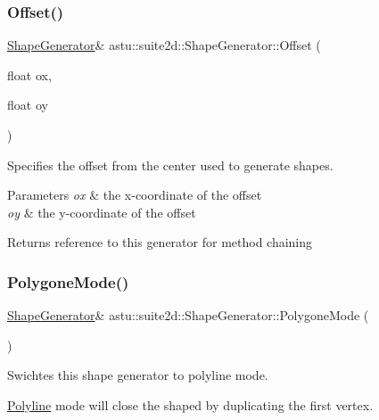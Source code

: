 \subsubsection{\texorpdfstring{Offset()}{Offset()}\hspace{0.1cm}{\footnotesize\ttfamily [2/2]}}
{\footnotesize\ttfamily \hyperlink{classastu_1_1suite2d_1_1ShapeGenerator}{Shape\+Generator}\& astu\+::suite2d\+::\+Shape\+Generator\+::\+Offset (\begin{DoxyParamCaption}\item[{float}]{ox,  }\item[{float}]{oy }\end{DoxyParamCaption})\hspace{0.3cm}{\ttfamily [inline]}}

Specifies the offset from the center used to generate shapes.


\begin{DoxyParams}{Parameters}
{\em ox} & the x-\/coordinate of the offset \\
\hline
{\em oy} & the y-\/coordinate of the offset \\
\hline
\end{DoxyParams}
\begin{DoxyReturn}{Returns}
reference to this generator for method chaining 
\end{DoxyReturn}
\mbox{\label{classastu_1_1suite2d_1_1ShapeGenerator_a86ebc573fad6a23691c62f0a34a6ba87}} 
\subsubsection{\texorpdfstring{Polygone\+Mode()}{PolygoneMode()}}
{\footnotesize\ttfamily \hyperlink{classastu_1_1suite2d_1_1ShapeGenerator}{Shape\+Generator}\& astu\+::suite2d\+::\+Shape\+Generator\+::\+Polygone\+Mode (\begin{DoxyParamCaption}{ }\end{DoxyParamCaption})\hspace{0.3cm}{\ttfamily [inline]}}

Swichtes this shape generator to polyline mode.

\hyperlink{classastu_1_1suite2d_1_1Polyline}{Polyline} mode will close the shaped by duplicating the first vertex. \mbox{\label{classastu_1_1suite2d_1_1ShapeGenerator_a7e1aa918a8a81b9e55c9d784ee6d38e8}} 
